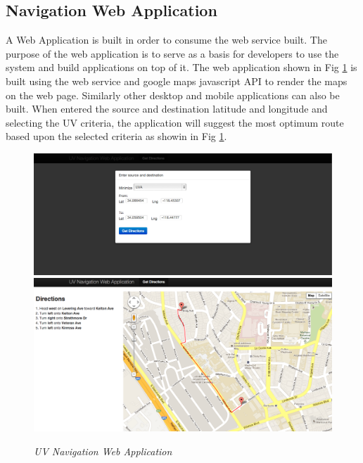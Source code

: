 \documentclass[10pt]{sigplan-proc-varsize}
\begin{document}
\subsection{Navigation Web Application}
A Web Application is built in order to consume the web service built. The purpose of the web application is to serve as a basis for developers to use the system and build applications on top of it. The web application shown in Fig \ref{fig:webapp} is built using the web service and google maps javascript API to render the maps on the web page. Similarly other desktop and mobile applications can also be built. When entered the source and destination latitude and longitude and selecting the UV criteria, the application will suggest the most optimum route based upon the selected criteria as showin in Fig \ref{fig:webapp}.
\begin{figure}
\begin{center}
\includegraphics[scale=0.19]{webapp1.png}
\includegraphics[scale=0.19]{webapp2.png}
\caption{\small \sl UV Navigation Web Application }
\label{fig:webapp}
\end{center}
\end{figure}
\end{document}
